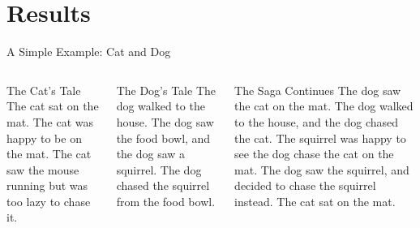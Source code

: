 \documentclass[handout]{beamer}
\begin{document}
\section{Results}
\begin{frame}[t]{A Simple Example: Cat and Dog}
\begin{columns}[T]
  \begin{block}{The Cat's Tale}
    \small
    The cat sat on the mat.  The cat was happy to be on the mat.  The
    cat saw the mouse running but was too lazy to chase it.
  \end{block}
  \begin{block}{The Dog's Tale}
    \small
    The dog walked to the house.  The dog saw the food bowl, and the
    dog saw a squirrel.  The dog chased the squirrel from the food
    bowl.
  \end{block}
  \begin{block}{The Saga Continues}
    \small
    The dog saw the cat on the mat.  The dog walked to the house, and
    the dog chased the cat.  The squirrel was happy to see the dog
    chase the cat on the mat.  The dog saw the squirrel, and decided
    to chase the squirrel instead.  The cat sat on the mat.
  \end{block}
\end{columns}
\end{frame}
\end{document}
